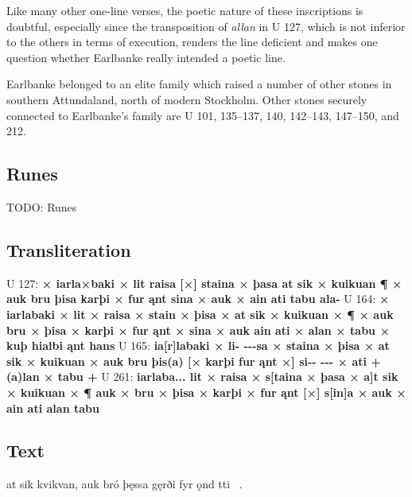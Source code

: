 Like many other one-line verses, the poetic nature of these inscriptions is doubtful, especially since the transposition of \emph{allan} in U 127, which is not inferior to the others in terms of execution, renders the line deficient and makes one question whether Earlbanke really intended a poetic line.

Earlbanke belonged to an elite family which raised a number of other stones in southern Attundaland, north of modern Stockholm.  Other stones securely connected to Earlbanke’s family are U 101, 135--137, 140, 142--143, 147--150, and 212.

\subsection{Runes}

TODO: Runes%

\subsection{Transliteration}

U 127: \textbf{× iarla×baki × lit raisa [×] staina × þasa at sik × kuikuan ¶ × auk bru þisa karþi × fur ąnt sina × auk × ain ati tabu ala-}
U 164: \textbf{× iarlabaki × lit × raisa × stain × þisa × at sik × kuikuan × ¶ × auk bru × þisa × karþi × fur ąnt × sina × auk ain ati × alan × tabu × kuþ hialbi ąnt hans}
U 165: \textbf{ia[r]labaki × li- -{}-{}-sa × staina × þisa × at sik × kuikuan × auk bru þis(a) [× karþi fur ąnt ×] si-{}- -{}-{}- × ati + (a)lan × tabu +}
U 261: \textbf{iarlaba... lit × raisa × s[taina × þasa × a]t sik × kuikuan × ¶ auk × bru × þisa × karþi × fur ąnt [×] s[in]a × auk × ain ati alan tabu}

\subsection{Text}

\bpg\bpa[0]%
\startsub {}    at sik kvikvan, auk bró þęssa gęrði fyr ǫnd  tti \hld\ . \\
\epa

